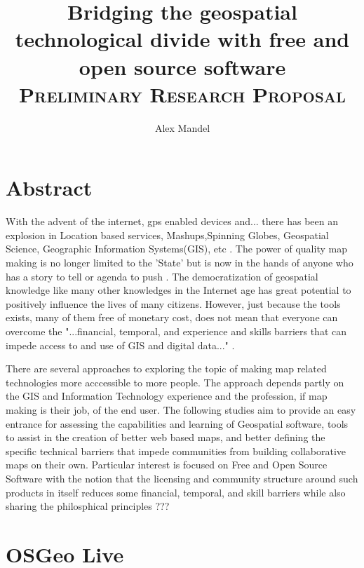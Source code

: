 \documentclass[12pt,letterpaper]{article}
\author{Alex Mandel}
\title{Bridging the geospatial technological divide with free and open source software
\\	
\textsc{\small Preliminary Research Proposal}\\[0.5cm]
}
\begin{document}
\maketitle
\section{Abstract}

	With the advent of the internet, gps enabled devices and... there has been an explosion in Location based services, Mashups,Spinning Globes, Geospatial Science, Geographic Information Systems(GIS), etc . The power of quality map making is no longer limited to the 'State' but is now in the hands of anyone who has a story to tell or agenda to push \parencite{Wood2010}. The democratization of geospatial knowledge like many other knowledges in the Internet age has great potential to positively influence the lives of many citizens. However, just because the tools exists, many of them free of monetary cost, does not mean that everyone can overcome the "...financial, temporal, and experience and skills barriers that can impede access to and use of GIS and digital data..." \parencite{Elwood2006}. 


	There are several approaches to exploring the topic of making map related technologies more acccessible to more people. The approach depends partly on the GIS and Information Technology experience and the profession, if map making is their job, of the end user. The following studies aim to provide an easy entrance for assessing the capabilities and learning of Geospatial software, tools to assist in the creation of better web based maps, and better defining the specific technical barriers that impede communities from building collaborative maps on their own. Particular interest is focused on Free and Open Source Software with the notion that the licensing and community structure around such products in itself reduces some financial, temporal, and skill barriers while also sharing the philosphical principles ??? 

\tableofcontents
\section{OSGeo Live}
\end{document}
